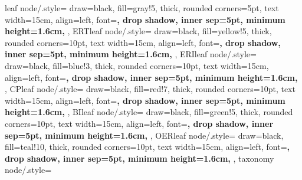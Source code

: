 {    leaf node/.style={ %
        draw=black,
        fill=gray!5, %
        thick,
        rounded corners=5pt,
        text width=15cm, %
        align=left, %
        font=\bfseries\large, %
        drop shadow,
        inner sep=5pt,
        minimum height=1.6cm, %
    },
    ERTleaf node/.style={ %
        draw=black,
        fill=yellow!5, %
        thick,
        rounded corners=10pt,
        text width=15cm, %
        align=left, %
        font=\bfseries\large, %
        drop shadow,
        inner sep=5pt,
        minimum height=1.6cm, %
    },
    ERIleaf node/.style={ %
        draw=black,
        fill=blue!3, %
        thick,
        rounded corners=10pt,
        text width=15cm, %
        align=left, %
        font=\bfseries\large, %
        drop shadow,
        inner sep=5pt,
        minimum height=1.6cm, %
    },
    CPleaf node/.style={ %
        draw=black,
        fill=red!7, %
        thick,
        rounded corners=10pt,
        text width=15cm, %
        align=left, %
        font=\bfseries\large, %
        drop shadow,
        inner sep=5pt,
        minimum height=1.6cm, %
    },
    BIleaf node/.style={ %
        draw=black,
        fill=green!5, %
        thick,
        rounded corners=10pt,
        text width=15cm, %
        align=left, %
        font=\bfseries\large, %
        drop shadow,
        inner sep=5pt,
        minimum height=1.6cm, %
    },
    OERleaf node/.style={ %
        draw=black,
        fill=teal!10, %
        thick,
        rounded corners=10pt,
        text width=15cm, %
        align=left, %
        font=\bfseries\large, %
        drop shadow,
        inner sep=5pt,
        minimum height=1.6cm, %
    },
    taxonomy node/.style={ %
}}
